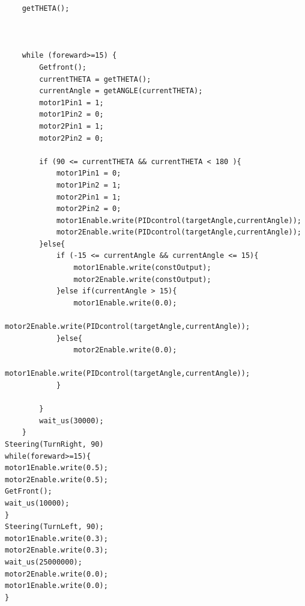 \documentclass[12pt, a4paper, oneside]{report}
\begin{document}
\begin{lstlisting}
    getTHETA();



    while (foreward>=15) {
        Getfront();
        currentTHETA = getTHETA();
        currentAngle = getANGLE(currentTHETA);
        motor1Pin1 = 1;
        motor1Pin2 = 0;
        motor2Pin1 = 1;
        motor2Pin2 = 0;
        
        if (90 <= currentTHETA && currentTHETA < 180 ){
            motor1Pin1 = 0;
            motor1Pin2 = 1;
            motor2Pin1 = 1;
            motor2Pin2 = 0;
            motor1Enable.write(PIDcontrol(targetAngle,currentAngle));
            motor2Enable.write(PIDcontrol(targetAngle,currentAngle));
        }else{
            if (-15 <= currentAngle && currentAngle <= 15){
                motor1Enable.write(constOutput);
                motor2Enable.write(constOutput);
            }else if(currentAngle > 15){
                motor1Enable.write(0.0);
                motor2Enable.write(PIDcontrol(targetAngle,currentAngle));
            }else{
                motor2Enable.write(0.0);
                motor1Enable.write(PIDcontrol(targetAngle,currentAngle));
            }

        }
        wait_us(30000);
    } 
Steering(TurnRight, 90)
while(foreward>=15){
motor1Enable.write(0.5);
motor2Enable.write(0.5);
GetFront();
wait_us(10000);
}
Steering(TurnLeft, 90);
motor1Enable.write(0.3);
motor2Enable.write(0.3);
wait_us(25000000);
motor2Enable.write(0.0);
motor1Enable.write(0.0);
}
\end{lstlisting}

\newpage
\end{document}
